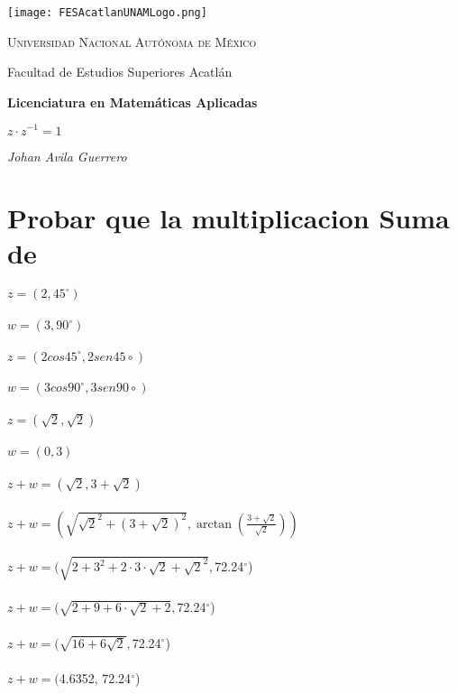 \documentclass[a4paper,12pt]{article}
\begin{document}
\begin{titlepage}
    \centering
    \texttt{[image: FESAcatlanUNAMLogo.png]} %
    \vspace{1cm}
    
    {\scshape\large Universidad Nacional Autónoma de México \par}
    {\large Facultad de Estudios Superiores Acatlán \par}
    \vspace{1.5cm}
    
    {\Large\bfseries Licenciatura en Matemáticas Aplicadas \par}
    \vspace{2cm}
    
    {\Huge\bfseries  \(z \cdot z^{-1} = 1 \)  \par}
    \vspace{2cm}
    
    {\Large\itshape Johan Avila Guerrero \par}
    \vfill
    
    
    \vfill
    
\end{titlepage}



\section*{Probar que la multiplicacion Suma de }
\noindent \(z=(2,45^\circ)  \)   \\ \\
 \(w=(3,90^\circ) \) \\ \\
 \(z=(2cos45^\circ , 2sen45\circ) \)   \\ \\
 \(w=(3cos90^\circ , 3sen90\circ)\) \\ \\
 \(z=(\sqrt{2} , \sqrt{2}) \)   \\ \\
 \(w=(0 , 3)\) \\ \\
 \(z+w= ( \sqrt{2}, 3+\sqrt{2}  )  \) \\ \\
 \(z+w= ( \sqrt{\sqrt{2}^2 + (3+\sqrt{2})^2}, \arctan(\frac{3+\sqrt{2}}{\sqrt{2}})  )  \) \\ \\
\(z+w=(\sqrt{2+3^2+2 \cdot3\cdot\sqrt{2} + \sqrt{2}^2 }, \)72.24\(^\circ\)) \\ \\
\(z+w= (\sqrt{2+9+6\cdot\sqrt{2} +2} , \)72.24\(^\circ\)) \\ \\ 
\(z+w= (\sqrt{16+6\sqrt{2}} , \)72.24\(^\circ\)) \\  \\
\(z+w= ( \)4.6352, 72.24\(^\circ\)) \\ 
\end{document}
